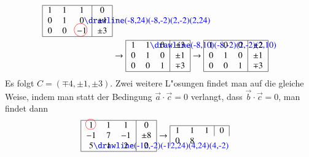 \begin{beispiel}
\begin{align*}
\begin{tabular}{|>{$}c<{$}>{$}c<{$}>{$}c<{$}|>{$}c<{$}|}
\hline
1&1&1&0\\
0&1&0%
\begin{picture}(0,0)%
\color{blue}\drawline(-8,24)(-8,-2)(2,-2)(2,24)
\end{picture}%
&\pm1\\
0&0&-1%
\begin{picture}(0,0)
\color{red}\put(-7,4){\circle{15}}
\end{picture}%
&\pm3\\
\hline
\end{tabular}
\\
&
\rightarrow
\begin{tabular}{|>{$}c<{$}>{$}c<{$}>{$}c<{$}|>{$}c<{$}|}
\hline
1&1%
\begin{picture}(0,0)%
\color{blue}\drawline(-8,10)(-8,-2)(2,-2)(2,10)
\end{picture}%
&0&\pm3\\
0&1&0&\pm1\\
0&0&1&\mp3\\
\hline
\end{tabular}
\rightarrow
\begin{tabular}{|>{$}c<{$}>{$}c<{$}>{$}c<{$}|>{$}c<{$}|}
\hline
1&0&0&\pm 2\\
0&1&0&\pm1\\
0&0&1&\mp3\\
\hline
\end{tabular}
\end{align*}
Es folgt $C=(\mp 4,\pm1,\pm3)$. Zwei weitere L"osungen findet
man auf die gleiche Weise, indem man statt der Bedingung $\vec a\cdot\vec c=0$
verlangt, dass $\vec b\cdot\vec c=0$, man findet dann
\begin{align*}
\begin{tabular}{|>{$}c<{$}>{$}c<{$}>{$}c<{$}|>{$}c<{$}|}
\hline
1%
\begin{picture}(0,0)
\color{red}\put(-3,4){\circle{12}}
\end{picture}%
&1&1&0\\
-1&7&-1&\pm8\\
5%
\begin{picture}(0,0)%
\color{blue}\drawline(-12,-2)(-12,24)(4,24)(4,-2)
\end{picture}%
&1&2&0\\
\hline
\end{tabular}
&
\rightarrow
\begin{tabular}{|>{$}c<{$}>{$}c<{$}>{$}c<{$}|>{$}c<{$}|}
\hline
1&1&1&0\\
0&8%
\begin{picture}(0,0)

\end{picture}
\end{tabular}
\end{align*}
\end{beispiel}
